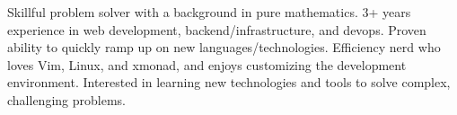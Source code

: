 

\begin{cvparagraph}

Skillful problem solver with a background in pure mathematics.
3+ years experience in web development, backend/infrastructure, and devops.
Proven ability to quickly ramp up on new languages/technologies.
Efficiency nerd who loves Vim, Linux, and xmonad, and enjoys customizing the development environment.
Interested in learning new technologies and tools to solve complex, challenging problems.
\end{cvparagraph}
